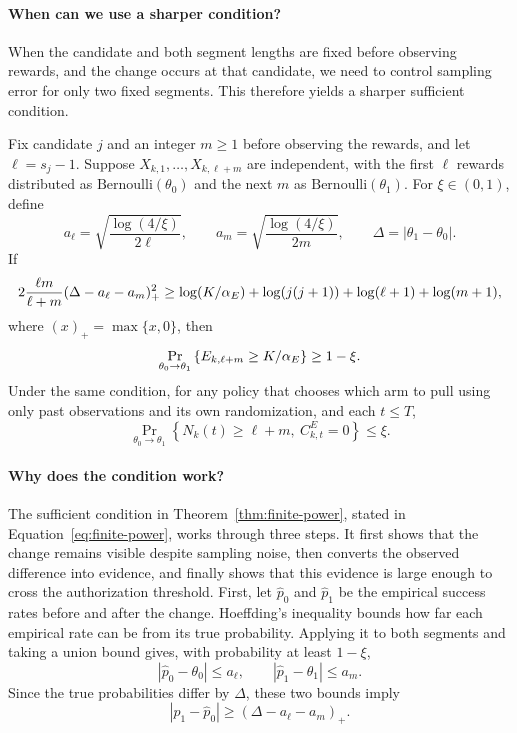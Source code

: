 \paragraph{When can we use a sharper condition?}

When the candidate and both segment lengths are fixed before observing
rewards, and the change occurs at that candidate, we need to control sampling
error for only two fixed segments.
This therefore yields a sharper sufficient condition.

\begin{theorem}
\label{thm:finite-power}
Fix candidate $j$ and an integer $m\geq1$ before observing the rewards,
and let $\ell=s_j-1$.
Suppose $X_{k,1},\ldots,X_{k,\ell+m}$ are independent, with the first
$\ell$ rewards distributed as $\mathrm{Bernoulli}(\theta_0)$ and
the next $m$ as $\mathrm{Bernoulli}(\theta_1)$.
For $\xi\in(0,1)$, define
\[
 a_\ell
 =
 \sqrt{\frac{\log(4/\xi)}{2\ell}},
 \qquad
 a_m
 =
 \sqrt{\frac{\log(4/\xi)}{2m}},
 \qquad
 \Delta
 =
 |\theta_1-\theta_0|.
\]
If
\begin{equation}
 2\frac{\ell m}{\ell+m}
 (\Delta-a_\ell-a_m)_+^2
 \ge
 \log(K/\alpha_E)
 +\log(j(j+1))
 +\log(\ell+1)
 +\log(m+1),
 \label{eq:finite-power}
\end{equation}
where $(x)_+=\max\{x,0\}$, then
\[
 \Pr_{\theta_0\to\theta_1}
 \left\{
 E_{k,\ell+m}\ge K/\alpha_E
 \right\}
 \ge
 1-\xi.
\]
Under the same condition, for any policy that chooses which arm
to pull using only past observations and its own randomization,
and each $t\leq T$,
\[
\Pr_{\theta_0\to\theta_1}
\left\{
N_k(t)\geq\ell+m,\ C^E_{k,t}=0
\right\}
\leq\xi.
\]
\end{theorem}

\paragraph{Why does the condition work?}
The sufficient condition in Theorem~\ref{thm:finite-power}, stated in
Equation~\eqref{eq:finite-power}, works through three steps.
It first shows that the change remains visible despite sampling noise, then converts the
observed difference into evidence, and finally shows that this evidence is
large enough to cross the authorization threshold.
First, let $\widehat p_0$ and $\widehat p_1$ be the
empirical success rates before and after the change.
Hoeffding's inequality bounds how far each empirical rate can be from its true probability.
Applying it to both segments and taking a union bound gives, with probability at least $1-\xi$,
\[
|\widehat p_0-\theta_0|\leq a_\ell,
\qquad
|\widehat p_1-\theta_1|\leq a_m.
\]
Since the true probabilities differ by $\Delta$, these two bounds imply
\[
|\widehat p_1-\widehat p_0|
\geq
(\Delta-a_\ell-a_m)_+.
\]

